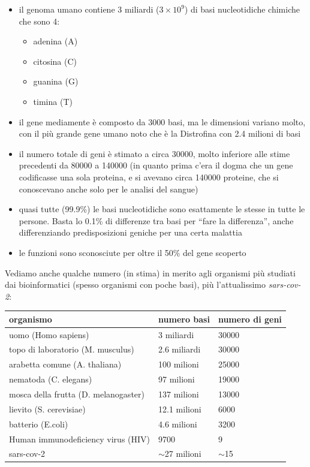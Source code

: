 \documentclass[a4paper,12pt, oneside]{book}
\begin{document}
\begin{itemize}
  \item il genoma umano contiene 3 miliardi ($3\times 10^9$) di basi
  nucleotidiche chimiche che sono 4:
  \begin{itemize}
    \item adenina (A)
    \item citosina (C)
    \item guanina (G)
    \item timina (T)
  \end{itemize}
  \item il gene mediamente è composto da 3000 basi, ma le dimensioni variano
  molto, con il più grande gene umano noto che è la Distrofina con 2.4 milioni
  di basi
  \item il numero totale di geni è stimato a circa 30000, molto inferiore alle
  stime precedenti da 80000 a 140000 (in quanto prima c'era il dogma che un
  gene codificasse una sola proteina, e si avevano circa 140000 proteine, che si
  conoscevano anche solo per le analisi del sangue)
  \item quasi tutte (99.9\%) le basi nucleotidiche sono esattamente le stesse in
  tutte le persone. Basta lo 0.1\% di differenze tra basi per ``fare la
  differenza'', anche differenziando predisposizioni geniche per una certa
  malattia
  \item le funzioni sono sconosciute per oltre il 50\% del gene scoperto 
\end{itemize}
Vediamo anche qualche numero (in stima) in merito agli organismi più studiati
dai bioinformatici (spesso organismi con poche basi), più l'attualissimo
\textit{sars-cov-2}: 
\begin{table}[H]
  \begin{tabular}{|l|l|l|}
    \hline organismo & numero basi & numero di geni \\
    \hline uomo (Homo sapiens) & 3 miliardi & 30000 \\
    \hline topo di laboratorio (M. musculus) & 2.6 miliardi & 30000 \\
    \hline arabetta comune  (A. thaliana) & 100 milioni & 25000 \\
    \hline nematoda (C. elegans) & 97 milioni & 19000 \\
    \hline mosca della frutta (D. melanogaster) & 137 milioni & 13000 \\
    \hline lievito (S. cerevisiae) & 12.1 milioni & 6000 \\
    \hline batterio (E.coli) & 4.6 milioni & 3200 \\
    \hline Human immunodeficiency virus (HIV) & 9700 & 9 \\
    \hline sars-cov-2 & $\sim$27 milioni & $\sim$15 \\
    \hline
  \end{tabular}
\end{table}
\end{document}
